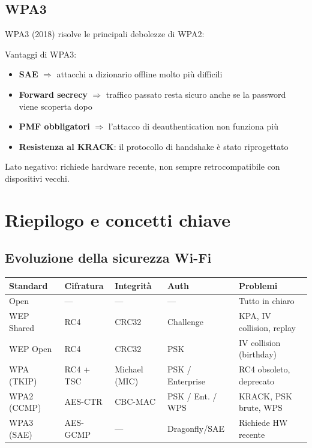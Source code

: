\subsection{WPA3}

WPA3 (2018) risolve le principali debolezze di WPA2:


Vantaggi di WPA3:
\begin{itemize}
  \item \textbf{SAE} $\Rightarrow$ attacchi a dizionario offline molto pi\`u difficili
  \item \textbf{Forward secrecy} $\Rightarrow$ traffico passato resta sicuro anche se la password viene scoperta dopo
  \item \textbf{PMF obbligatori} $\Rightarrow$ l'attacco di deauthentication non funziona pi\`u
  \item \textbf{Resistenza al KRACK}: il protocollo di handshake \`e stato riprogettato
\end{itemize}

Lato negativo: richiede hardware recente, non sempre retrocompatibile con dispositivi vecchi.

\section{Riepilogo e concetti chiave}

\subsection{Evoluzione della sicurezza Wi-Fi}

\begin{center}
\begin{tabular}{|l|l|l|l|l|}
\hline
\textbf{Standard} & \textbf{Cifratura} & \textbf{Integrit\`a} & \textbf{Auth} & \textbf{Problemi} \\
\hline
Open & --- & --- & --- & Tutto in chiaro \\
WEP Shared & RC4 & CRC32 & Challenge & KPA, IV collision, replay \\
WEP Open & RC4 & CRC32 & PSK & IV collision (birthday) \\
WPA (TKIP) & RC4 + TSC & Michael (MIC) & PSK / Enterprise & RC4 obsoleto, deprecato \\
WPA2 (CCMP) & AES-CTR & CBC-MAC & PSK / Ent. / WPS & KRACK, PSK brute, WPS \\
WPA3 (SAE) & AES-GCMP & --- & Dragonfly/SAE & Richiede HW recente \\
\hline
\end{tabular}
\end{center}

